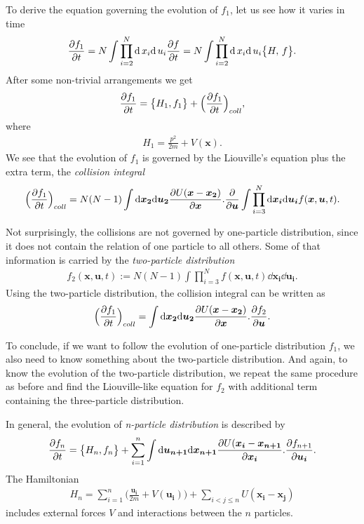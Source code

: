 To derive the equation governing the evolution of $f_1$, let us see how it varies in time
\begin{align*}
\frac{\partial f_1}{\partial t} = N \int \prod_{i=2}^N \mathrm{d} \, x_i \mathrm{d} \, u_i \frac{\partial f}{\partial t} = N \int \prod_{i=2}^N \mathrm{d} \, x_i \mathrm{d} \, u_i \big\{ H, \, f \big\}.
\end{align*}
After some non-trivial arrangements we get
\begin{align} \label{boltzman}
\frac{\partial f_1}{\partial t} = \big\{ H_1, f_1 \big\} + \Big(\frac{\partial f_1}{\partial t} \Big)_{coll},
\end{align}
where
\begin{align*}
H_1 = \frac{p^2}{2m} + V(\bm{x}).
\end{align*}
We see that the evolution of $f_1$ is governed by the Liouville's equation plus the extra term, the \textit{collision integral}
\begin{align*}
\Big(\frac{\partial f_1}{\partial t} \Big)_{coll} = N(N-1) \int \mathrm{d} \bm{x_2} \mathrm{d} \bm{u_2} 
\frac{\partial U(\bm{x} - \bm{x_2})}{\partial {\bm{x}}} . \frac{\partial}{\partial \bm{u}} \int \prod_{i=3}^N \mathrm{d} \bm{x_i} \mathrm{d}\bm{u_i} f(\bm{x},\bm{u},t).
\end{align*}

Not surprisingly, the collisions are not governed by one-particle distribution, since it does not contain the relation of one particle to all others. Some of that information is carried by the \textit{two-particle distribution}
\begin{align*}
f_2(\bm{x},\bm{u},t) := N(N-1)\int \prod_{i=3}^N f(\bm{x},\bm{u},t) \dd \bm{x_i} \dd \bm{u_i}.
\end{align*}
Using the two-particle distribution, the collision integral can be written as
\begin{align*}
\Big(\frac{\partial f_1}{\partial t} \Big)_{coll} = \int \mathrm{d} \bm{x_2} \mathrm{d} \bm{u_2} \frac{\partial U(\bm{x} - \bm{x_2})}{\partial \bm{x}} . \frac{\partial f_2}{\partial\bm{u}}.
\end{align*}

To conclude, if we want to follow the evolution of one-particle distribution $f_1$, we also need to know something about the two-particle distribution. And again, to know the evolution of the two-particle distribution, we repeat the same procedure as before and find the Liouville-like equation for $f_2$ with additional term containing the three-particle distribution.

In general, the evolution of \textit{n-particle distribution} is described by
\begin{align} \label{bgky}
\frac{\partial f_n}{\partial t} = \big\{ H_n, f_n \big\} + \sum_{i=1}^n \int \mathrm{d} \bm{u_{n+1}} \mathrm{d} \bm{x_{n+1}} \frac{\partial U(\bm{x_i} - \bm{x_{n+1}}}{\partial \bm{x_i}}.\frac{\partial f_{n+1}}{\partial \bm{u_i}}.
\end{align}
The Hamiltonian 
\begin{align*}
H_n = \sum_{i=1}^n \Big(\frac{\bm{u_i}}{2m} + V(\bm{u_i})\Big) + \sum_{i<j\leq n} U(\bm{x_i} - \bm{x_j})
\end{align*}
includes external forces $V$ and interactions between the $n$ particles.

